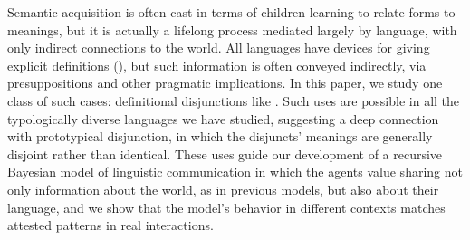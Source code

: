 Semantic acquisition is often cast in terms of children learning to
relate forms to meanings, but it is actually a lifelong process
mediated largely by language, with only indirect connections to the
world.  All languages have devices for giving explicit definitions
(), but such information is often
conveyed indirectly, via presuppositions and other pragmatic
implications. In this paper, we study one class of such cases:
definitional disjunctions like .  Such
uses are possible in all the typologically diverse languages we have
studied, suggesting a deep connection with prototypical disjunction,
in which the disjuncts' meanings are generally disjoint rather than
identical. These uses guide our development of a recursive Bayesian
model of linguistic communication in which the agents value sharing
not only information about the world, as in previous models, but also
about their language, and we show that the model's behavior in
different contexts matches attested patterns in real interactions.

